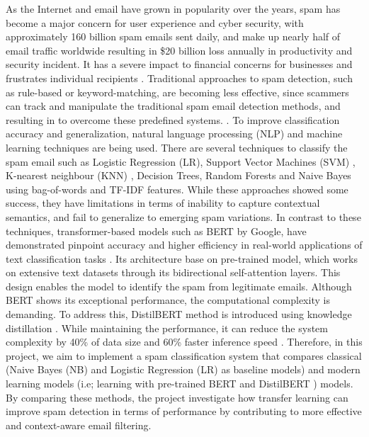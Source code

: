\documentclass[11pt]{article}
\begin{document}
As the Internet and email have grown in popularity over the years, spam has become a major concern for user experience and cyber security, with approximately 160 billion spam emails sent daily, and make up nearly half of email traffic worldwide \cite{cai2024SpamStat} resulting in \$20 billion loss annually in productivity and security incident. It has a severe impact to financial concerns for businesses and frustrates individual recipients \cite{shazad2024spam}. Traditional approaches to spam detection, such as rule-based or keyword-matching, are becoming less effective, since scammers can track and manipulate the traditional spam email detection methods, and resulting in to overcome these predefined systems. \cite{khan2024adversarial}. To improve classification accuracy and generalization, natural language processing (NLP) and machine learning techniques are being used. There are several techniques to classify the spam email such as Logistic Regression (LR), Support Vector Machines (SVM) \cite{cervantes2020comprehensive}, K-nearest neighbour (KNN) \cite{abu2019effects}, Decision Trees, Random Forests and Naive Bayes using bag-of-words and TF-IDF features. While these approaches showed some success, they have limitations in terms of inability to capture contextual semantics, and fail to generalize to emerging spam variations. In contrast to these techniques, transformer-based models such as BERT by Google, have demonstrated pinpoint accuracy and higher efficiency in real-world applications of text classification tasks \cite{agusman2025comparative}. Its architecture base on pre-trained model, which works on extensive text datasets through its bidirectional self-attention layers. This design enables the model to identify the spam from legitimate emails. Although BERT shows its exceptional performance, the computational complexity is demanding. To address this, DistilBERT method is introduced using knowledge distillation \cite{agusman2025comparative}. While maintaining the performance, it can reduce the system complexity by 40\% of data size and 60\% faster inference speed \cite{sanh2019distilbert}. Therefore, in this project, we aim to implement a spam classification system that compares classical (Naive Bayes (NB) and Logistic Regression (LR) as baseline models) and modern learning models (i.e; learning with pre-trained BERT \cite{devlin2019bert} and DistilBERT \cite{sanh2019distilbert}) models. By comparing these methods, the project investigate how transfer learning can improve spam detection in terms of performance by contributing to more effective and context-aware email filtering.
\end{document}
